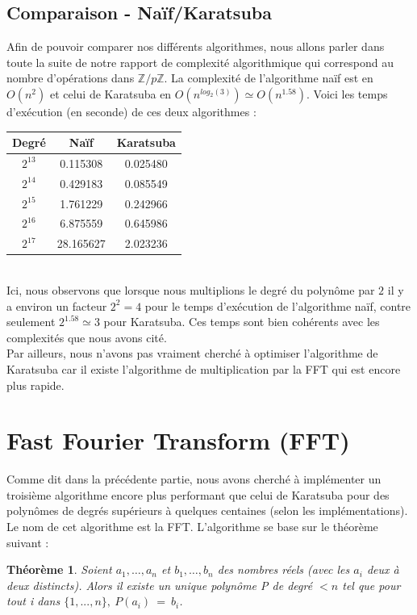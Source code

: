 \documentclass[12pt, a4paper]{article}
\begin{document}
\subsection{Comparaison - Naïf/Karatsuba}
Afin de pouvoir comparer nos différents algorithmes, nous allons parler dans toute la suite de notre rapport de complexité algorithmique qui correspond au nombre d'opérations dans $\mathbb{Z}/p\mathbb{Z}$. La complexité de l'algorithme naïf est en $O(n^2)$ et celui de Karatsuba en $O(n^{log_2(3)}) \simeq O(n^{1.58})$. Voici les temps d'exécution (en seconde) de ces deux algorithmes :
\\
\begin{center}
\begin{tabular}{||c c c||}
\hline
Degré & Naïf & Karatsuba \\
\hline\hline
$2^{13}$ & 0.115308 & 0.025480 \\
\hline
$2^{14}$ & 0.429183 & 0.085549 \\
\hline
$2^{15}$ & 1.761229 & 0.242966 \\
\hline
$2^{16}$ & 6.875559 & 0.645986 \\
\hline
$2^{17}$ & 28.165627 & 2.023236 \\
\hline
\end{tabular}
\end{center}
\
\\
Ici, nous observons que lorsque nous multiplions le degré du polynôme par $2$ il y a environ un facteur $2^2 = 4$ pour le temps d'exécution de l'algorithme naïf, contre seulement $2^{1.58} \simeq 3$ pour Karatsuba. Ces temps sont bien cohérents avec les complexités que nous avons cité. \\
Par ailleurs, nous n'avons pas vraiment cherché à optimiser l'algorithme de Karatsuba car il existe l'algorithme de multiplication par la FFT qui est encore plus rapide.

\newpage

\section{Fast Fourier Transform (FFT)}

Comme dit dans la précédente partie, nous avons cherché à implémenter un troisième algorithme encore plus performant que celui de Karatsuba pour des polynômes de degrés supérieurs à quelques centaines (selon les implémentations). Le nom de cet algorithme est la FFT. L'algorithme se base sur le théorème suivant :

\newtheorem{Thm1}{Théorème}
\begin{Thm1}
Soient $a_1,\dots,a_n$ et $b_1,\dots,b_n$ des nombres réels (avec les $a_i$ deux à deux distincts). Alors il existe un unique polynôme P de degré $< n$ tel que pour tout i dans $\{1,..., n\},\ P(a_i)\ =\ b_i$.
\end{Thm1}
\end{document}
